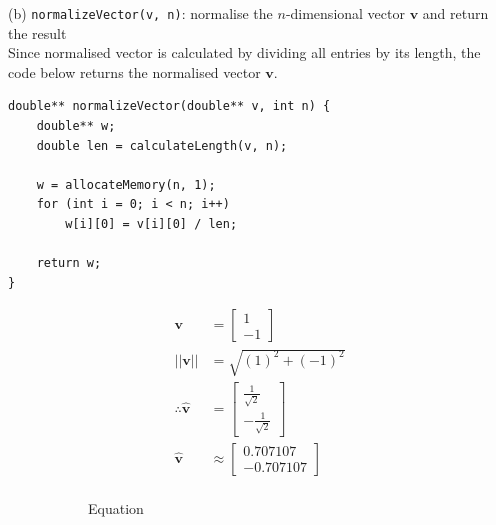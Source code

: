(b) \texttt{normalizeVector(v, n)}: normalise the $n$-dimensional vector $\mathbf{v}$ and return the result\\
Since normalised vector is calculated by dividing all entries by its length, the code below returns the normalised vector $\mathbf{v}$.
\begin{verbatim}
double** normalizeVector(double** v, int n) {
    double** w;
    double len = calculateLength(v, n);

    w = allocateMemory(n, 1);
    for (int i = 0; i < n; i++)
        w[i][0] = v[i][0] / len;

    return w;
}
\end{verbatim}
\begin{figure}[h]
    \centering
    \begin{subfigure}[b]{0.45\textwidth}
        \centering
        \begin {align*}
        \mathbf{v} &= \begin{bmatrix}
            1\\-1
        \end{bmatrix}\\
        ||\mathbf{v}|| &= \sqrt{(1)^2+(-1)^2}\\
        \therefore \hat{\mathbf{v}} &= \begin{bmatrix}
            \frac{1}{\sqrt{2}}\\-\frac{1}{\sqrt{2}}
        \end{bmatrix}\\
        \hat{\mathbf{v}} &\approx \begin{bmatrix}
            0.707107\\-0.707107
        \end{bmatrix}\\
        \end {align*}
        \caption{Equation}
        \label{fig:equation}
    \end{subfigure}
    \hfill
    \begin{subfigure}[b]{0.45\textwidth}
        \centering

\end{subfigure}
\end{figure}
